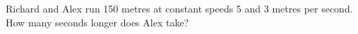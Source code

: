 Richard and Alex run 150 metres at constant speeds 5 and 3 metres per second. How many seconds longer does Alex take?
